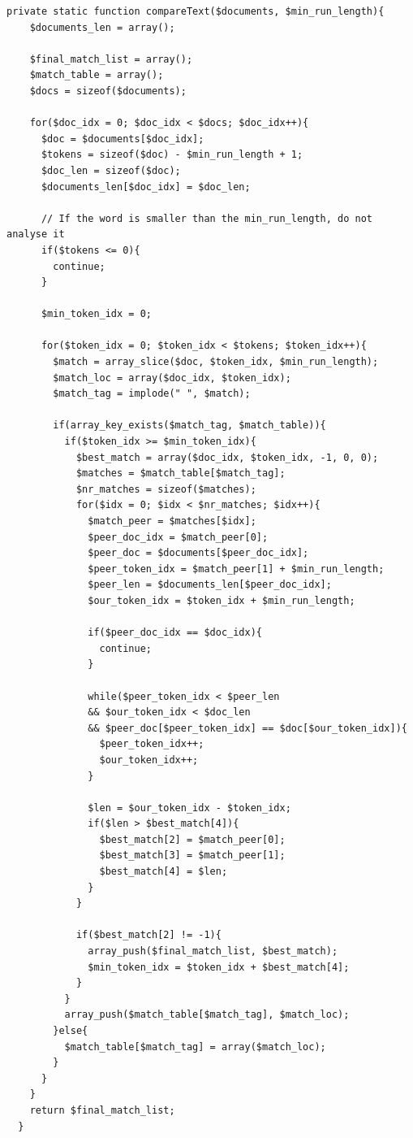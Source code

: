 \begin{lstlisting}[caption=Cropping an image to a square aspect ratio]
private static function compareText($documents, $min_run_length){
    $documents_len = array();

    $final_match_list = array();
    $match_table = array();
    $docs = sizeof($documents);

    for($doc_idx = 0; $doc_idx < $docs; $doc_idx++){
      $doc = $documents[$doc_idx];
      $tokens = sizeof($doc) - $min_run_length + 1;
      $doc_len = sizeof($doc);
      $documents_len[$doc_idx] = $doc_len;

      // If the word is smaller than the min_run_length, do not analyse it
      if($tokens <= 0){
        continue;
      }

      $min_token_idx = 0;

      for($token_idx = 0; $token_idx < $tokens; $token_idx++){
        $match = array_slice($doc, $token_idx, $min_run_length);
        $match_loc = array($doc_idx, $token_idx);
        $match_tag = implode(" ", $match);

        if(array_key_exists($match_tag, $match_table)){
          if($token_idx >= $min_token_idx){
            $best_match = array($doc_idx, $token_idx, -1, 0, 0);
            $matches = $match_table[$match_tag];
            $nr_matches = sizeof($matches);
            for($idx = 0; $idx < $nr_matches; $idx++){
              $match_peer = $matches[$idx];
              $peer_doc_idx = $match_peer[0];
              $peer_doc = $documents[$peer_doc_idx];
              $peer_token_idx = $match_peer[1] + $min_run_length;
              $peer_len = $documents_len[$peer_doc_idx];
              $our_token_idx = $token_idx + $min_run_length;

              if($peer_doc_idx == $doc_idx){
                continue;
              }

              while($peer_token_idx < $peer_len
              && $our_token_idx < $doc_len
              && $peer_doc[$peer_token_idx] == $doc[$our_token_idx]){
                $peer_token_idx++;
                $our_token_idx++;
              }

              $len = $our_token_idx - $token_idx;
              if($len > $best_match[4]){
                $best_match[2] = $match_peer[0];
                $best_match[3] = $match_peer[1];
                $best_match[4] = $len;
              }
            }

            if($best_match[2] != -1){
              array_push($final_match_list, $best_match);
              $min_token_idx = $token_idx + $best_match[4];
            }
          }
          array_push($match_table[$match_tag], $match_loc);
        }else{
          $match_table[$match_tag] = array($match_loc);
        }
      }
    }
    return $final_match_list;
  }
\end{lstlisting}